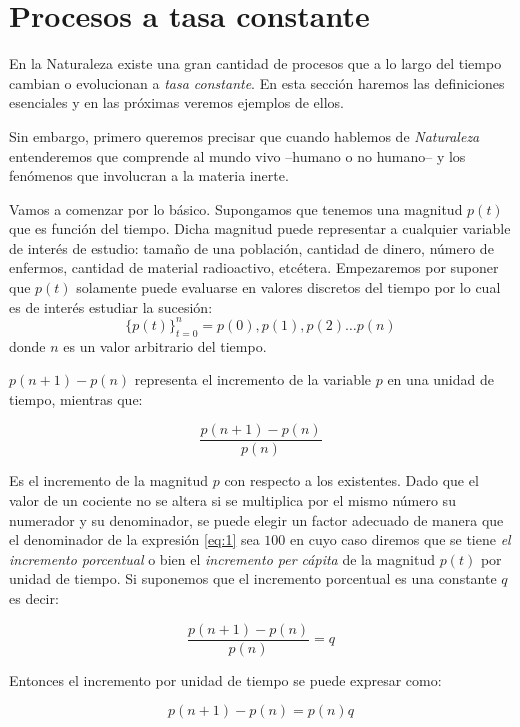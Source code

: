

\section{Procesos a tasa constante}

En la Naturaleza existe una gran cantidad de procesos que a lo largo del tiempo cambian o evolucionan a {\it tasa constante}. En esta sección haremos las definiciones esenciales y en las próximas veremos ejemplos de ellos.

Sin embargo, primero queremos precisar que cuando hablemos de {\it Naturaleza } entenderemos que comprende al mundo vivo --humano o no humano-- y los fenómenos que involucran a la materia inerte.

Vamos a  comenzar por lo básico. Supongamos que tenemos una magnitud $p(t)$ que es función del tiempo. Dicha magnitud puede representar a cualquier variable de interés de estudio: tamaño de una población, cantidad de dinero, número de enfermos, cantidad de material radioactivo, etcétera. Empezaremos por suponer que $p(t)$ solamente puede evaluarse en valores discretos del tiempo por lo cual es de interés estudiar la sucesión:
\[
\{p(t)\}_{t=0}^n = p(0),p(1),p(2)\hdots p(n)
\]
\noindent donde $n$ es un valor arbitrario del tiempo.

$p(n+1)-p(n)$ representa el incremento de la variable $p$ en una unidad de tiempo, mientras que:

 
\begin{equation} \label{eq:1}
 \dfrac {p(n+1) -p(n) }{p(n)}
\end{equation}

 
 Es el incremento de la magnitud $p$ con respecto a los existentes. Dado que el valor de un cociente no se altera si se multiplica por el mismo número su numerador y su denominador, se puede elegir un factor adecuado de manera que el denominador de la expresión \ref{eq:1} sea $100$ en cuyo caso diremos que se tiene  \emph{el incremento porcentual} o bien el \emph{incremento per cápita} de la magnitud $p(t)$ por unidad de tiempo. Si suponemos que el incremento porcentual es una constante $q$ es decir:
 
\begin{equation} \label{eq:2}
 \dfrac {p(n+1)-p(n)}{p(n)}=q
\end{equation}

\noindent Entonces el incremento por unidad de tiempo se puede expresar como: 

 \begin{equation} \label{eq:3}
 p(n+1) -p(n)=p(n)q
\end{equation}

